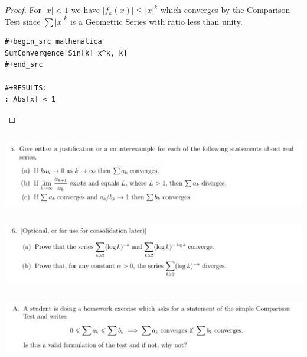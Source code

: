 \documentclass[12pt]{article}
\begin{document}
\begin{enumerate}[label=(\alph*)]
\begin{proof}
    For $|x| < 1$ we have $|f_k(x)| \leq |x|^k$ which converges by the Comparison Test since
    $\sum |x|^k$ is a Geometric Series with ratio less than unity.

\begin{verbatim}
#+begin_src mathematica
SumConvergence[Sin[k] x^k, k]
#+end_src

#+RESULTS:
: Abs[x] < 1

\end{verbatim}
\checkmark
  \end{proof}

\end{enumerate}


\newpage
\subsection{}
\begin{mdframed}
\includegraphics[width=400pt]{img/analysis--oxford-M2-I-6-5.png}
\end{mdframed}

\newpage
\subsection{}
\begin{mdframed}
\includegraphics[width=400pt]{img/analysis--oxford-M2-I-6-6.png}
\end{mdframed}

\newpage
\subsection{}
\begin{mdframed}
\includegraphics[width=400pt]{img/analysis--oxford-M2-I-6-extra-A.png}
\end{mdframed}
\end{document}
